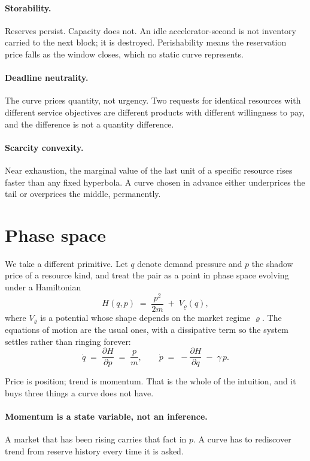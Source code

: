 \documentclass[11pt,a4paper]{article}
\begin{document}
\paragraph{Storability.} Reserves persist. Capacity does not. An idle
accelerator-second is not inventory carried to the next block; it is destroyed.
Perishability means the reservation price falls as the window closes, which no
static curve represents.

\paragraph{Deadline neutrality.} The curve prices quantity, not urgency. Two
requests for identical resources with different service objectives are different
products with different willingness to pay, and the difference is not a quantity
difference.

\paragraph{Scarcity convexity.} Near exhaustion, the marginal value of the last
unit of a specific resource rises faster than any fixed hyperbola. A curve chosen
in advance either underprices the tail or overprices the middle, permanently.

\section{Phase space}

We take a different primitive. Let $q$ denote demand pressure and $p$ the shadow
price of a resource kind, and treat the pair as a point in phase space evolving
under a Hamiltonian
\begin{equation}
H(q,p) \;=\; \frac{p^{2}}{2m} \;+\; V_{\varrho}(q),
\end{equation}
where $V_{\varrho}$ is a potential whose shape depends on the market regime
$\varrho$. The equations of motion are the usual ones, with a dissipative term so
the system settles rather than ringing forever:
\begin{equation}
\dot q \;=\; \frac{\partial H}{\partial p} \;=\; \frac{p}{m},
\qquad
\dot p \;=\; -\frac{\partial H}{\partial q} \;-\; \gamma\, p .
\end{equation}

Price is position; trend is momentum. That is the whole of the intuition, and it
buys three things a curve does not have.

\paragraph{Momentum is a state variable, not an inference.} A market that has
been rising carries that fact in $p$. A curve has to rediscover trend from
reserve history every time it is asked.
\end{document}
